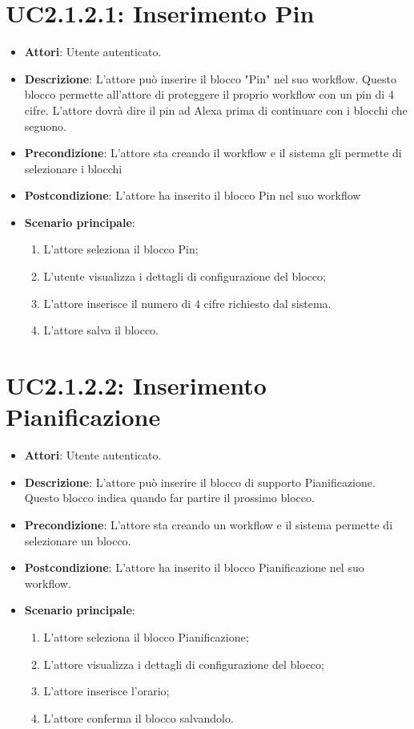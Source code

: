 \section{UC2.1.2.1: Inserimento Pin}
\label{UC2.1.2.1}
\begin{itemize}
	\item \textbf{Attori}: Utente autenticato.
	\item \textbf{Descrizione}: L'attore può inserire il blocco "Pin" nel suo workflow. Questo blocco permette all'attore di proteggere il proprio workflow con un pin di 4 cifre. L'attore dovrà dire il pin ad Alexa prima di continuare con i blocchi che seguono.
	\item \textbf{Precondizione}: L'attore sta creando il workflow e il sistema gli permette di selezionare i blocchi
	\item \textbf{Postcondizione}: L'attore ha inserito il blocco Pin nel suo workflow
	\item \textbf{Scenario principale}:
	\begin{enumerate} \item L'attore seleziona il blocco Pin; \item L'utente visualizza i dettagli di configurazione del blocco;   \item L'attore inserisce il numero di 4 cifre richiesto dal sistema. \item L'attore salva il blocco.\end{enumerate}
\end{itemize}

\section{UC2.1.2.2: Inserimento Pianificazione}
\label{UC2.1.2.2}
\begin{itemize}
	\item \textbf{Attori}: Utente autenticato.
	\item \textbf{Descrizione}: L'attore può inserire il blocco di supporto Pianificazione. Questo blocco indica quando far partire il prossimo blocco.
	\item \textbf{Precondizione}: L'attore sta creando un workflow e il sistema permette di selezionare un blocco.
	\item \textbf{Postcondizione}: L'attore ha inserito il blocco Pianificazione nel suo workflow.
	\item \textbf{Scenario principale}:
	\begin{enumerate} \item L'attore seleziona il blocco Pianificazione; \item L'attore visualizza i dettagli di configurazione del blocco; \item L'attore inserisce l'orario; \item L'attore conferma il blocco salvandolo. \end{enumerate}
\end{itemize}

